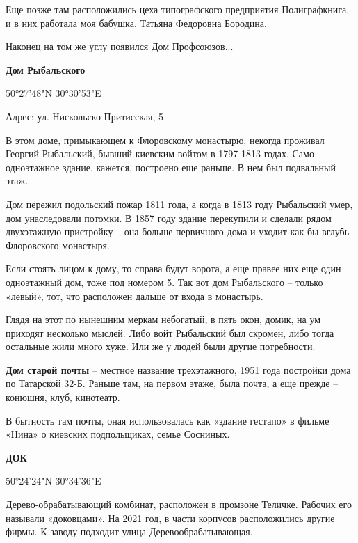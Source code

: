 Еще позже там расположились цеха типографского предприятия Полиграфкнига, и в них работала моя бабушка, Татьяна Федоровна Бородина.

Наконец на том же углу появился Дом Профсоюзов...\\

\medskip


\textbf{Дом Рыбальского}

50°27'48"N   30°30'53"E

Адрес: ул. Нискольско-Притисская, 5

В этом доме, примыкающем к Флоровскому монастырю, некогда проживал Георгий Рыбальский, бывший киевским войтом в 1797-1813 годах. Само одноэтажное здание, кажется, построено еще раньше. В нем был подвальный этаж.

Дом пережил подольский пожар 1811 года, а когда в 1813 году Рыбальский умер, дом унаследовали потомки. В 1857 году здание перекупили и сделали рядом двухэтажную пристройку – она больше первичного дома и уходит как бы вглубь Флоровского монастыря.

Если стоять лицом к дому, то справа будут ворота, а еще правее них еще один одноэтажный дом, тоже под номером 5. Так вот дом Рыбальского – только «левый», тот, что расположен дальше от входа в монастырь.

Глядя на этот по нынешним меркам небогатый, в пять окон, домик, на ум приходят несколько мыслей. Либо войт Рыбальский был скромен, либо тогда остальные жили много хуже. Или же у людей были другие потребности.\\

\medskip

\textbf{Дом старой почты} – местное название трехэтажного, 1951 года постройки дома по Татарской 32-Б. Раньше там, на первом этаже, была почта, а еще прежде – конюшня, клуб, кинотеатр.

В бытность там почты, оная использовалась как «здание гестапо» в фильме «Нина» о киевских подпольщиках, семье Сосниных.\\

\medskip


\textbf{ДОК}

50°24'24"N 30°34'36"E

Дерево-обрабатывающий комбинат, расположен в промзоне Теличке. Рабочих его называли «доковцами». На 2021 год, в части корпусов расположились другие фирмы. К заводу подходит улица Деревообрабатывающая.\\

